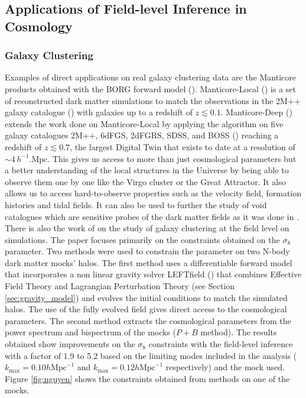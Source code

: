 \subsection{Applications of Field-level Inference in Cosmology} \label{sec:applications_fli}

\subsubsection{Galaxy Clustering}

Examples of direct applications on real galaxy clustering data are the Manticore products obtained with the BORG forward model (\cite{Jens_2013, Jasche_2019}). Manticore-Local (\cite{Mcalpine_2025}) is a set of reconstructed dark matter simulations to 
match the observations in the 2M++ galaxy catalogue (\cite{Lavaux_2011}) with galaxies up to a redshift of $z \lesssim 0.1$. Manticore-Deep (\cite{Mcalpine_2026}) extends the work done on Manticore-Local 
by applying the algorithm on five galaxy catalogues 2M++, 6dFGS, 2dFGRS, SDSS, and BOSS (\cite{Lavaux_2011,Jones_2009_6dFGS,Colless_2003_2dFGRS,
York_2000_SDSS,Dawson_2013_BOSS}) reaching a redshift of $z \lesssim 0.7$, the largest Digital Twin that exists to date at a resolution of $\sim 4 \, h^{-1}.\text{Mpc}$. 
This gives us access to more than just cosmological parameters but a better understanding of the local 
structures in the Universe by being able to observe them one by one like the Virgo cluster or the Great Attractor. 
It also allows us to access hard-to-observe properties such as the velocity field, formation histories and tidal fields. 
It can also be used to further the study of void catalogues 
which are sensitive probes of the dark matter fields as it was done in \cite{Malandrino_2026}. \\


There is also the work of \cite{Nguyen_2024} on the study of galaxy clustering at the field level on simulations. 
The paper focuses primarily on the constraints obtained on the $\sigma_8$ 
parameter. Two methods were used to constrain the parameter on two N-body dark matter mocks' halos. 
The first method uses a differentiable forward model that incorporates a non linear gravity 
solver LEFTfield (\cite{Schmidt_2021}) that combines Effective Field Theory and Lagrangian Perturbation Theory (see Section \ref{sec:gravity_model}) and 
evolves the initial conditions 
to match the simulated halos. The use of the fully evolved field gives direct access to the cosmological parameters. The second method extracts the cosmological 
parameters from 
the power spectrum and bispectrum of the mocks ($P+B$ method). The results obtained show improvements on the $\sigma_8$ constraints with the field-level inference 
with a factor of 1.9 to 5.2 
based on the limiting modes included in the analysis ($k_{\text{max}} = 0.10 h \text{Mpc}^{-1}$ and $k_{\text{max}} = 0.12 h \text{Mpc}^{-1}$ respectively)
and the mock used. Figure \ref{fig:nguyen} shows the constraints obtained from methods on one of the mocks. \\ 

